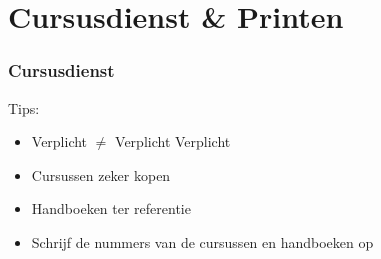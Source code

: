 \section{Cursusdienst \& Printen}
\begin{frame}[allowframebreaks=10]
	\frametitle{Cursusdienst}
    \vspace{0.5cm}
    
    Tips:
    \begin{itemize}
        \item Verplicht $\neq$ Verplicht Verplicht
        \item Cursussen zeker kopen
        \item Handboeken ter referentie
        \item Schrijf de nummers van de cursussen en handboeken op
	\end{itemize}
    


\end{frame}
